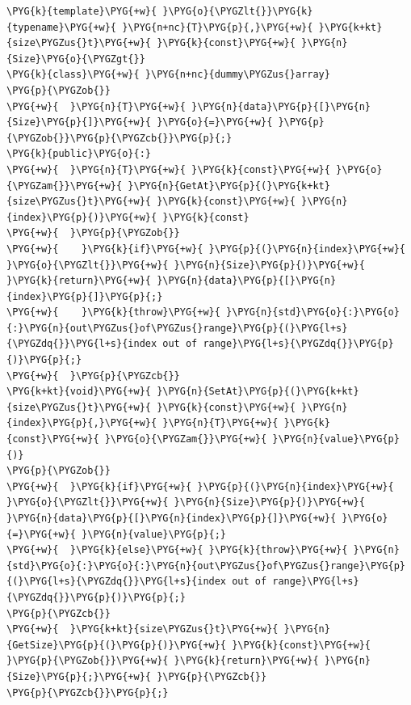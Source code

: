 \begin{codeblockbg}
\begin{Verbatim}[commandchars=\\\{\},breaklines=true,breakanywhere=true,fontsize=\codefont,xleftmargin=17bp]
\PYG{k}{template}\PYG{+w}{ }\PYG{o}{\PYGZlt{}}\PYG{k}{typename}\PYG{+w}{ }\PYG{n+nc}{T}\PYG{p}{,}\PYG{+w}{ }\PYG{k+kt}{size\PYGZus{}t}\PYG{+w}{ }\PYG{k}{const}\PYG{+w}{ }\PYG{n}{Size}\PYG{o}{\PYGZgt{}}
\PYG{k}{class}\PYG{+w}{ }\PYG{n+nc}{dummy\PYGZus{}array}
\PYG{p}{\PYGZob{}}
\PYG{+w}{  }\PYG{n}{T}\PYG{+w}{ }\PYG{n}{data}\PYG{p}{[}\PYG{n}{Size}\PYG{p}{]}\PYG{+w}{ }\PYG{o}{=}\PYG{+w}{ }\PYG{p}{\PYGZob{}}\PYG{p}{\PYGZcb{}}\PYG{p}{;}
\PYG{k}{public}\PYG{o}{:}
\PYG{+w}{  }\PYG{n}{T}\PYG{+w}{ }\PYG{k}{const}\PYG{+w}{ }\PYG{o}{\PYGZam{}}\PYG{+w}{ }\PYG{n}{GetAt}\PYG{p}{(}\PYG{k+kt}{size\PYGZus{}t}\PYG{+w}{ }\PYG{k}{const}\PYG{+w}{ }\PYG{n}{index}\PYG{p}{)}\PYG{+w}{ }\PYG{k}{const}
\PYG{+w}{  }\PYG{p}{\PYGZob{}}
\PYG{+w}{    }\PYG{k}{if}\PYG{+w}{ }\PYG{p}{(}\PYG{n}{index}\PYG{+w}{ }\PYG{o}{\PYGZlt{}}\PYG{+w}{ }\PYG{n}{Size}\PYG{p}{)}\PYG{+w}{ }\PYG{k}{return}\PYG{+w}{ }\PYG{n}{data}\PYG{p}{[}\PYG{n}{index}\PYG{p}{]}\PYG{p}{;}
\PYG{+w}{    }\PYG{k}{throw}\PYG{+w}{ }\PYG{n}{std}\PYG{o}{:}\PYG{o}{:}\PYG{n}{out\PYGZus{}of\PYGZus{}range}\PYG{p}{(}\PYG{l+s}{\PYGZdq{}}\PYG{l+s}{index out of range}\PYG{l+s}{\PYGZdq{}}\PYG{p}{)}\PYG{p}{;}
\PYG{+w}{  }\PYG{p}{\PYGZcb{}}
\PYG{k+kt}{void}\PYG{+w}{ }\PYG{n}{SetAt}\PYG{p}{(}\PYG{k+kt}{size\PYGZus{}t}\PYG{+w}{ }\PYG{k}{const}\PYG{+w}{ }\PYG{n}{index}\PYG{p}{,}\PYG{+w}{ }\PYG{n}{T}\PYG{+w}{ }\PYG{k}{const}\PYG{+w}{ }\PYG{o}{\PYGZam{}}\PYG{+w}{ }\PYG{n}{value}\PYG{p}{)}
\PYG{p}{\PYGZob{}}
\PYG{+w}{  }\PYG{k}{if}\PYG{+w}{ }\PYG{p}{(}\PYG{n}{index}\PYG{+w}{ }\PYG{o}{\PYGZlt{}}\PYG{+w}{ }\PYG{n}{Size}\PYG{p}{)}\PYG{+w}{ }\PYG{n}{data}\PYG{p}{[}\PYG{n}{index}\PYG{p}{]}\PYG{+w}{ }\PYG{o}{=}\PYG{+w}{ }\PYG{n}{value}\PYG{p}{;}
\PYG{+w}{  }\PYG{k}{else}\PYG{+w}{ }\PYG{k}{throw}\PYG{+w}{ }\PYG{n}{std}\PYG{o}{:}\PYG{o}{:}\PYG{n}{out\PYGZus{}of\PYGZus{}range}\PYG{p}{(}\PYG{l+s}{\PYGZdq{}}\PYG{l+s}{index out of range}\PYG{l+s}{\PYGZdq{}}\PYG{p}{)}\PYG{p}{;}
\PYG{p}{\PYGZcb{}}
\PYG{+w}{  }\PYG{k+kt}{size\PYGZus{}t}\PYG{+w}{ }\PYG{n}{GetSize}\PYG{p}{(}\PYG{p}{)}\PYG{+w}{ }\PYG{k}{const}\PYG{+w}{ }\PYG{p}{\PYGZob{}}\PYG{+w}{ }\PYG{k}{return}\PYG{+w}{ }\PYG{n}{Size}\PYG{p}{;}\PYG{+w}{ }\PYG{p}{\PYGZcb{}}
\PYG{p}{\PYGZcb{}}\PYG{p}{;}
\end{Verbatim}
\end{codeblockbg}



